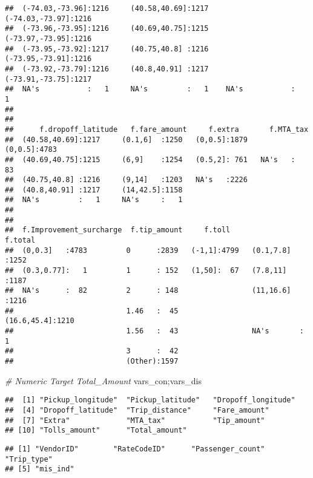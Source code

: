 \documentclass[]{article}
\newenvironment{Shaded}{\begin{snugshade}}{\end{snugshade}}
\newcommand{\CommentTok}[1]{\textcolor[rgb]{0.56,0.35,0.01}{\textit{{#1}}}}
\newcommand{\NormalTok}[1]{{#1}}
\begin{document}
\begin{verbatim}
##  (-74.03,-73.96]:1216     (40.58,40.69]:1217    (-74.03,-73.97]:1216    
##  (-73.96,-73.95]:1216     (40.69,40.75]:1215    (-73.97,-73.95]:1216    
##  (-73.95,-73.92]:1217     (40.75,40.8] :1216    (-73.95,-73.91]:1216    
##  (-73.92,-73.79]:1216     (40.8,40.91] :1217    (-73.91,-73.75]:1217    
##  NA's           :   1     NA's         :   1    NA's           :   1    
##                                                                         
##                                                                         
##      f.dropoff_latitude   f.fare_amount     f.extra       f.MTA_tax   
##  (40.58,40.69]:1217     (0.1,6]  :1250   (0,0.5]:1879   (0,0.5]:4783  
##  (40.69,40.75]:1215     (6,9]    :1254   (0.5,2]: 761   NA's   :  83  
##  (40.75,40.8] :1216     (9,14]   :1203   NA's   :2226                 
##  (40.8,40.91] :1217     (14,42.5]:1158                                
##  NA's         :   1     NA's     :   1                                
##                                                                       
##                                                                       
##  f.Improvement_surcharge  f.tip_amount     f.toll            f.total    
##  (0,0.3]   :4783         0      :2839   (-1,1]:4799   (0.1,7.8]  :1252  
##  (0.3,0.77]:   1         1      : 152   (1,50]:  67   (7.8,11]   :1187  
##  NA's      :  82         2      : 148                 (11,16.6]  :1216  
##                          1.46   :  45                 (16.6,45.4]:1210  
##                          1.56   :  43                 NA's       :   1  
##                          3      :  42                                   
##                          (Other):1597
\end{verbatim}

\begin{Shaded}
\begin{Highlighting}[]
\CommentTok{# Numeric Target Total_Amount}
\NormalTok{vars_con;vars_dis}
\end{Highlighting}
\end{Shaded}

\begin{verbatim}
##  [1] "Pickup_longitude"  "Pickup_latitude"   "Dropoff_longitude"
##  [4] "Dropoff_latitude"  "Trip_distance"     "Fare_amount"      
##  [7] "Extra"             "MTA_tax"           "Tip_amount"       
## [10] "Tolls_amount"      "Total_amount"
\end{verbatim}

\begin{verbatim}
## [1] "VendorID"        "RateCodeID"      "Passenger_count" "Trip_type"      
## [5] "mis_ind"
\end{verbatim}
\end{document}
